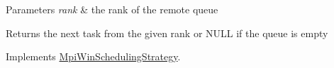 \begin{DoxyParams}{Parameters}
{\em rank} & the rank of the remote queue\\
\hline
\end{DoxyParams}
\begin{DoxyReturn}{Returns}
the next task from the given rank or N\+U\+L\+L if the queue is empty 
\end{DoxyReturn}


Implements \hyperlink{a00058_ac1804574e61c9ed91c7f78bc48b332ea}{Mpi\+Win\+Scheduling\+Strategy}.

